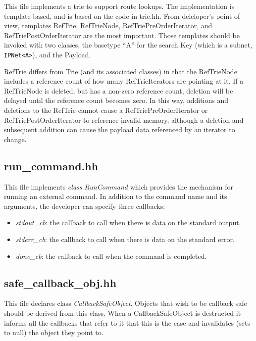 \documentclass[11pt]{article}
\begin{document}
This file implements a trie to support route lookups.  The
implementation is template-based, and is based on the code in
trie.hh. From deleloper's point of view, templates RefTrie, RefTrieNode,
RefTriePreOrderIterator, and RefTriePostOrderIterator are the most important.
Those templates should be invoked
with two classes, the basetype ``A'' for the search Key (which is a
subnet, \verb=IPNet<A>=), and the Payload.

RefTrie differs from Trie (and its associated classes) in that the
RefTrieNode includes a reference count of how many RefTrieIterators
are pointing at it.  If a RefTrieNode is deleted, but has a non-zero
reference count, deletion will be delayed until the reference count
becomes zero.  In this way, additions and deletions to the RefTrie
cannot cause a RefTriePreOrderIterator or RefTriePostOrderIterator
to reference invalid memory, although a deletion and subsequent addition can
cause the payload data referenced by an iterator to change.

\subsection{run\_command.hh}

This file implements \emph{class RunCommand} which provides the
mechanism for running an external command. In addition to the command
name and its arguments, the developer can specify three callbacks:

\begin{itemize}

  \item \emph{stdout\_cb}: the callback to call when there is data on
   the standard output.

  \item \emph{stderr\_cb}: the callback to call when there is data on
   the standard error.

  \item \emph{done\_cb}: the callback to call when the command is completed.

\end{itemize}

\subsection{safe\_callback\_obj.hh}

This file declares class \emph{CallbackSafeObject}.
Objects that wish to be callback safe should be derived from this
class. When a CallbackSafeObject is destructed it informs all the callbacks
that refer to it that this is the case and invalidates (sets to null)
the object they point to.
\end{document}
